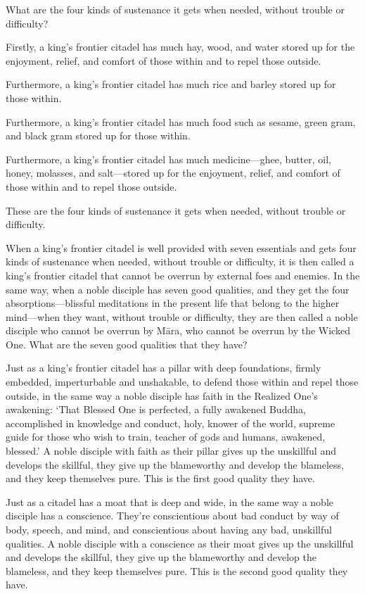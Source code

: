 \documentclass[12pt,openany]{book}%
\begin{document}
What are the four kinds of sustenance it gets when needed, without trouble or difficulty? 

Firstly, a king’s frontier citadel has much hay, wood, and water stored up for the enjoyment, relief, and comfort of those within and to repel those outside. 

Furthermore, a king’s frontier citadel has much rice and barley stored up for those within. 

Furthermore, a king’s frontier citadel has much food such as sesame, green gram, and black gram stored up for those within. 

Furthermore, a king’s frontier citadel has much medicine—ghee, butter, oil, honey, molasses, and salt—stored up for the enjoyment, relief, and comfort of those within and to repel those outside. 

These are the four kinds of sustenance it gets when needed, without trouble or difficulty. 

When a king’s frontier citadel is well provided with seven essentials and gets four kinds of sustenance when needed, without trouble or difficulty, it is then called a king’s frontier citadel that cannot be overrun by external foes and enemies. In the same way, when a noble disciple has seven good qualities, and they get the four absorptions—blissful meditations in the present life that belong to the higher mind—when they want, without trouble or difficulty, they are then called a noble disciple who cannot be overrun by \textsanskrit{Māra}, who cannot be overrun by the Wicked One. What are the seven good qualities that they have? 

Just as a king’s frontier citadel has a pillar with deep foundations, firmly embedded, imperturbable and unshakable, to defend those within and repel those outside, in the same way a noble disciple has faith in the Realized One’s awakening: ‘That Blessed One is perfected, a fully awakened Buddha, accomplished in knowledge and conduct, holy, knower of the world, supreme guide for those who wish to train, teacher of gods and humans, awakened, blessed.’ A noble disciple with faith as their pillar gives up the unskillful and develops the skillful, they give up the blameworthy and develop the blameless, and they keep themselves pure. This is the first good quality they have. 

Just as a citadel has a moat that is deep and wide, in the same way a noble disciple has a conscience. They’re conscientious about bad conduct by way of body, speech, and mind, and conscientious about having any bad, unskillful qualities. A noble disciple with a conscience as their moat gives up the unskillful and develops the skillful, they give up the blameworthy and develop the blameless, and they keep themselves pure. This is the second good quality they have. 
\end{document}
